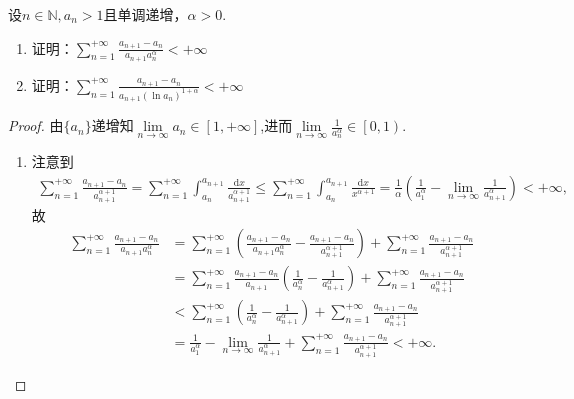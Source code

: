 \documentclass[../../main.tex]{subfiles}%
\begin{document}
\begin{example}
设\( n \in \mathbb{N}, a_n > 1 \)且单调递增，\( \alpha > 0 \).
\begin{enumerate}
\item 证明：\( \sum_{n=1}^{+\infty} \frac{a_{n+1} - a_n}{a_{n+1}a_n^\alpha} < +\infty \)

\item 证明：\( \sum_{n=1}^{+\infty} \frac{a_{n+1} - a_n}{a_{n+1}(\ln a_n)^{1+\alpha}} < +\infty \)
\end{enumerate}
\end{example}
\begin{proof}
由$\{a_n\}$递增知$\underset{n\rightarrow \infty}{\lim}a_n\in \left[ 1,+\infty \right]$,进而$\underset{n\rightarrow \infty}{\lim}\frac{1}{a_{n}^{\alpha}}\in \left[ 0,1 \right)$.
\begin{enumerate}[(1)]
\item 注意到
\begin{align*}
\sum_{n=1}^{+\infty} \frac{a_{n+1} - a_n}{a_{n+1}^{\alpha + 1}} = \sum_{n=1}^{+\infty} \int_{a_n}^{a_{n+1}} \frac{\mathrm{d}x}{a_{n+1}^{\alpha + 1}} \leqslant \sum_{n=1}^{+\infty} \int_{a_n}^{a_{n+1}} \frac{\mathrm{d}x}{x^{\alpha + 1}} = \frac{1}{\alpha} \left( \frac{1}{a_1^{\alpha}} - \lim_{n \rightarrow \infty} \frac{1}{a_{n+1}^{\alpha}} \right) < +\infty,
\end{align*}
故
\begin{align*}
\sum_{n=1}^{+\infty} \frac{a_{n+1} - a_n}{a_{n+1}a_n^{\alpha}} &= \sum_{n=1}^{+\infty} \left( \frac{a_{n+1} - a_n}{a_{n+1}a_n^{\alpha}} - \frac{a_{n+1} - a_n}{a_{n+1}^{\alpha + 1}} \right) + \sum_{n=1}^{+\infty} \frac{a_{n+1} - a_n}{a_{n+1}^{\alpha + 1}} \\
&= \sum_{n=1}^{+\infty} \frac{a_{n+1} - a_n}{a_{n+1}} \left( \frac{1}{a_n^{\alpha}} - \frac{1}{a_{n+1}^{\alpha}} \right) + \sum_{n=1}^{+\infty} \frac{a_{n+1} - a_n}{a_{n+1}^{\alpha + 1}} \\
&< \sum_{n=1}^{+\infty} \left( \frac{1}{a_n^{\alpha}} - \frac{1}{a_{n+1}^{\alpha}} \right) + \sum_{n=1}^{+\infty} \frac{a_{n+1} - a_n}{a_{n+1}^{\alpha + 1}} \\
&= \frac{1}{a_1^{\alpha}} - \lim_{n \rightarrow \infty} \frac{1}{a_{n+1}^{\alpha}} + \sum_{n=1}^{+\infty} \frac{a_{n+1} - a_n}{a_{n+1}^{\alpha + 1}} < +\infty.
\end{align*}


\end{enumerate}
\end{proof}
\end{document}
